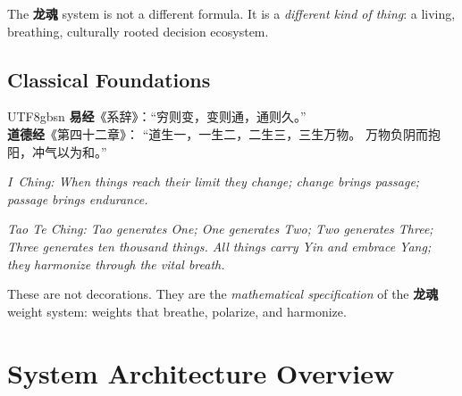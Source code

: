 \documentclass[conference]{IEEEtran}
\newcommand{\LH}{\textcolor{dragonRed}{\textbf{龙魂}}}
\newcommand{\IC}{\textcolor{goldYellow}{\textbf{易经}}}
\newcommand{\TCH}{\textcolor{jadeGreen}{\textbf{道德经}}}
\begin{document}
The \LH{} system is not a different formula.
It is a \emph{different kind of thing}:
a living, breathing, culturally rooted decision ecosystem.

\subsection{Classical Foundations}

\begin{CJK}{UTF8}{gbsn}
\IC{}《系辞》：``穷则变，变则通，通则久。''\\
\TCH{}《第四十二章》：
``道生一，一生二，二生三，三生万物。
万物负阴而抱阳，冲气以为和。''
\end{CJK}

\noindent\textit{I~Ching: When things reach their limit
they change; change brings passage; passage brings
endurance.}

\noindent\textit{Tao Te Ching: Tao generates One; One
generates Two; Two generates Three; Three generates ten
thousand things. All things carry Yin and embrace Yang;
they harmonize through the vital breath.}

These are not decorations.
They are the \emph{mathematical specification}
of the \LH{} weight system: weights that breathe,
polarize, and harmonize.

\section{System Architecture Overview}
\end{document}
